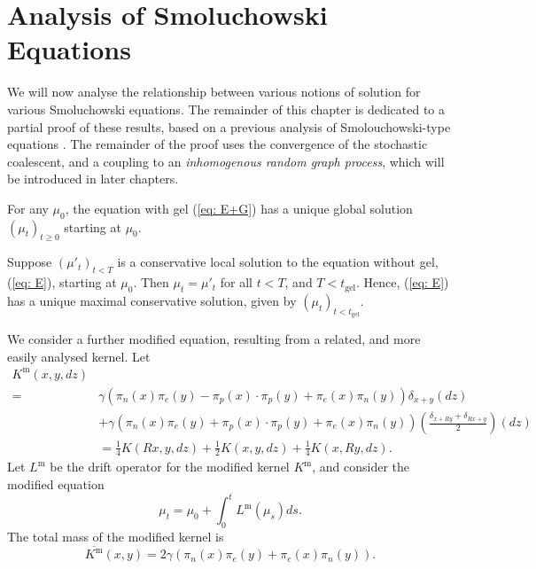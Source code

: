 \section{Analysis of Smoluchowski Equations}\label{sec:SE} We will now analyse the relationship between various notions of solution for various Smoluchowski equations.  The remainder of this chapter is dedicated to a partial proof of these results, based on a previous analysis of Smolouchowski-type equations \cite{N00}. The remainder of the proof uses the convergence of the stochastic coalescent, and a coupling to an \emph{inhomogenous random graph process}, which will be introduced in later chapters.  
\begin{lemma} \label{lemma: E and U} For any $\mu_0$, the equation with gel (\ref{eq: E+G}) has a unique global solution $(\mu_t)_{t\geq 0}$ starting at $\mu_0$.  \end{lemma} \begin{corollary}\label{cor: maximal conservative solutions} Suppose $(\mu'_t)_{t<T}$ is a conservative local solution to the equation without gel, (\ref{eq: E}), starting at $\mu_0$. Then $\mu_t=\mu'_t$ for all $t<T$, and $T<t_\mathrm{gel}$. Hence, (\ref{eq: E}) has a unique maximal conservative solution, given by $(\mu_t)_{t<t_\mathrm{gel}}$.\end{corollary}  We consider a further modified equation, resulting from a related, and more easily analysed kernel. Let \begin{equation}
    \label{eq: modified K} \begin{split} K^\text{m}(x,y,dz)& \\  = & \gamma(\pi_n(x)\pi_e(y)-\pi_p(x)\cdot \pi_p(y)+ \pi_e(x)\pi_n(y))\delta_{x+y}(dz) \\ & + \gamma(\pi_n(x)\pi_e(y)+\pi_p(x)\cdot \pi_p(y)+ \pi_e(x)\pi_n(y))\left(\frac{\delta_{x+Ry}+\delta_{Rx+y}}{2}\right)(dz) \\ & =\frac{1}{4}K(Rx, y, dz)+\frac{1}{2}K(x,y,dz)+\frac{1}{4}K(x,Ry, dz). \end{split} 
\end{equation} Let $L^\text{m}$ be the drift operator for the modified kernel $K^\text{m}$, and consider the modified equation \begin{equation} \tag{mE-G}\label{eq: mE}
    \mu_t=\mu_0+\int_0^t L^\text{m}(\mu_s)ds.
\end{equation}The total mass of the modified kernel is \begin{equation}
    \label{eq: modified Kbar} \overline{K^\text{m}}(x,y)=2\gamma(\pi_n(x)\pi_e(y)+\pi_e(x)\pi_n(y)).
\end{equation}
